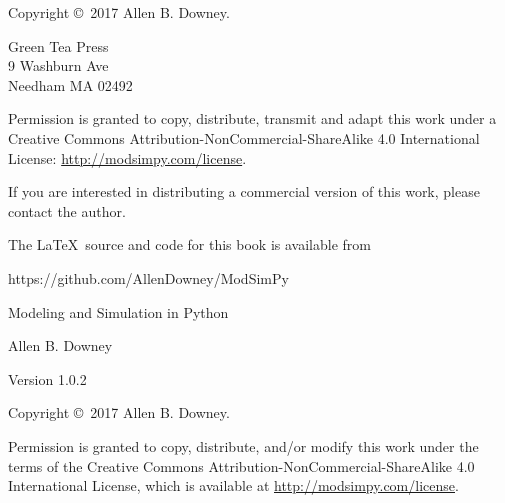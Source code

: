 \documentclass[12pt]{book}
\newcommand{\thetitle}{Modeling and Simulation in Python}
\newcommand{\theauthors}{Allen B. Downey}
\newcommand{\theversion}{1.0.2}
\theoremstyle{exercise}
\begin{document}
\begin{latexonly}
\begin{flushright}
\vfill

\end{flushright}



\pagebreak
\thispagestyle{empty}

Copyright \copyright ~2017 \theauthors.



\vspace{0.2in}

\begin{flushleft}
Green Tea Press       \\
9 Washburn Ave \\
Needham MA 02492
\end{flushleft}

Permission is granted to copy, distribute, transmit and adapt this work under a Creative Commons Attribution-NonCommercial-ShareAlike 4.0 International License: \url{http://modsimpy.com/license}.

If you are interested in distributing a commercial version of this
work, please contact the author.

The \LaTeX\ source and code for this book is available from

\begin{code}
https://github.com/AllenDowney/ModSimPy
\end{code}


\cleardoublepage
\setcounter{tocdepth}{1}
\tableofcontents

\end{latexonly}



\begin{htmlonly}

\vspace{1em}

{\Large \thetitle}

{\large \theauthors}

Version \theversion

\vspace{1em}

Copyright \copyright ~2017 \theauthors.

Permission is granted to copy, distribute, and/or modify this work
under the terms of the Creative Commons
Attribution-NonCommercial-ShareAlike 4.0 International License, which is
available at \url{http://modsimpy.com/license}.

\vspace{1em}

\setcounter{chapter}{-1}

\end{htmlonly}
\end{document}
